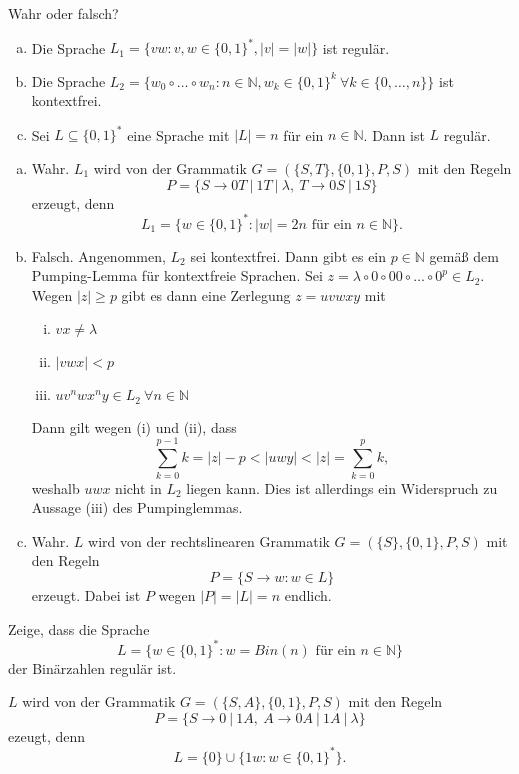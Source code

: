 \documentclass[german,headsepline]{scrartcl}
\begin{document}
	\begin{question} %
		Wahr oder falsch?
		\begin{enumerate}[(a)]
			\item Die Sprache $L_1=\{vw\colon v,w\in\{0,1\}^*,\vert v\vert=\vert w\vert\}$ ist regulär.
			\item Die Sprache $L_2=\{w_0\circ\ldots\circ w_n\colon n\in\mathbb{N}, w_k\in\{0,1\}^k~\forall k\in\{0,\dots,n\}\}$ ist kontextfrei.
			\item Sei $L\subseteq\{0,1\}^*$ eine Sprache mit $\vert L\vert=n$ für ein $n\in\mathbb{N}$. Dann ist $L$ regulär.
		\end{enumerate}
	\end{question}
	\begin{solution}
		\begin{enumerate}[(a)]
			\item Wahr. $L_1$ wird von der Grammatik $G=(\{S,T\},\{0,1\},P,S)$ mit den Regeln
				\[P=\{S\rightarrow0T~|~1T~|~\lambda,~T\rightarrow0S~|~1S\}\]
				erzeugt, denn
				\[L_1=\{w\in\{0,1\}^*\colon\vert w\vert=2n\text{ für ein }n\in\mathbb{N}\}.\]
			\item Falsch. Angenommen, $L_2$ sei kontextfrei.
				Dann gibt es ein $p\in\mathbb{N}$ gemäß dem Pumping-Lemma für kontextfreie Sprachen.
				Sei $z=\lambda\circ0\circ00\circ\ldots\circ0^p\in L_2$.
				Wegen $\vert z\vert\geq p$ gibt es dann eine Zerlegung $z=uvwxy$ mit
				\begin{enumerate}[(i)]
					\item $vx\neq\lambda$
					\item $\vert vwx\vert<p$
					\item $uv^nwx^ny\in L_2~\forall n\in\mathbb{N}$
				\end{enumerate}
				Dann gilt wegen (i) und (ii), dass
				\[\sum_{k=0}^{p-1}k=\vert z\vert-p<\vert uwy\vert<\vert z\vert=\sum_{k=0}^{p}k,\]
				weshalb $uwx$ nicht in $L_2$ liegen kann.
				Dies ist allerdings ein Widerspruch zu Aussage (iii) des Pumpinglemmas.
			\item Wahr. $L$ wird von der rechtslinearen Grammatik $G=(\{S\},\{0,1\},P,S)$ mit den Regeln
				\[P=\{S\to w\colon w\in L\}\]
				erzeugt. Dabei ist $P$ wegen $\vert P\vert=\vert L\vert=n$ endlich.
		\end{enumerate}
	\end{solution}
	
	\begin{question}
		Zeige, dass die Sprache
		\[L=\{w\in\{0,1\}^*\colon w=Bin(n)\text{ für ein }n\in\mathbb{N}\}\]
		der Binärzahlen regulär ist.
	\end{question}
	\begin{solution}
		$L$ wird von der Grammatik $G=(\{S,A\},\{0,1\},P,S)$ mit den Regeln
		\[P=\{S\rightarrow0~|~1A,~A\rightarrow0A~|~1A~|~\lambda\}\]
		ezeugt, denn
		\[L=\{0\}\cup\{1w\colon w\in\{0,1\}^*\}\text{.}\]
	\end{solution}
	
\end{document}
